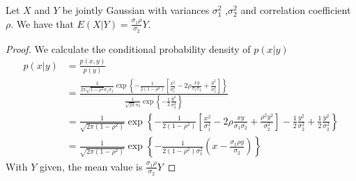 \begin{lemma} {Let $X$ and $Y$ be jointly Gaussian with variances $\sigma_1^2$ ,$\sigma_2^2$ and correlation coefficient $\rho$. We have that $E(X|Y) = \frac{\sigma_1 \rho}{\sigma_2} Y$.}
  \begin{proof}
    We calculate the conditional probability density of $p(x|y)$
    \begin{equation}
      \begin{aligned}
        p(x|y) &= \frac{p(x,y)}{p(y)} \\
        &= \frac{\frac{1}{2\pi \sqrt{1-\rho^2}\sigma_1\sigma_2} \operatorname{exp}\left\{-\frac{1}{2(1-\rho^2)}\left[\frac{x^2}{\sigma_1^2}-2\rho\frac{xy}{\sigma_1\sigma_2}+\frac{y^2}{\sigma_2^2}\right]\right\}}{\frac{1}{\sqrt{2\pi}\sigma_2}\operatorname{exp} \left\{ - \frac{1}{2} \frac{y^2}{\sigma_2^2}\right\} }  \\
        &= \frac{1}{\sqrt{2\pi (1-\rho^2)}} \operatorname{exp} \left\{ -\frac{1}{2(1-\rho^2)}\left[\frac{x^2}{\sigma_1^2}-2\rho\frac{xy}{\sigma_1\sigma_2}+\frac{\rho^2 y^2}{\sigma_2^2}\right] -\frac{1}{2} \frac{y^2}{\sigma_2^2}  +\frac{1}{2} \frac{y^2}{\sigma_2^2}   \right\} \\
        &= \frac{1}{\sqrt{2\pi (1-\rho^2)}} \operatorname{exp} \left\{ -\frac{1}{2(1-\rho^2)\sigma_1^2}\left(x - \frac{\sigma_1 \rho y}{\sigma_2}\right)   \right\}
      \end{aligned}
    \end{equation}
    With $Y$ given, the mean value is $\frac{\sigma_1 \rho}{\sigma_2} Y$
  \end{proof}
\end{lemma}


